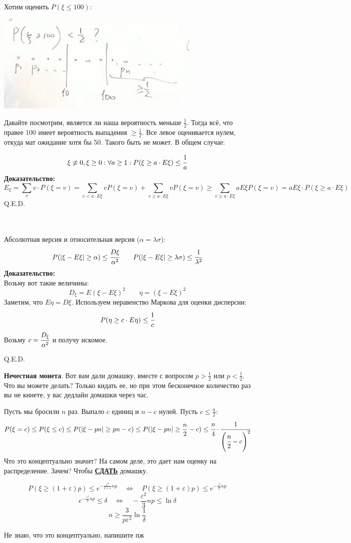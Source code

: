 Хотим оценить $P(\xi\leq 100)$:
\begin{center}
    \includegraphics[width = 10cm]{assets/3_3_1.jpg}
\end{center}

Давайте посмотрим, является ли наша вероятность меньше $\frac 1 2$. Тогда всё, что правее 100 имеет вероятность выпадения $\geq \frac1 2 $. Все левое оценивается нулем, откуда мат ожидание хотя бы 50. Такого быть не может. В общем случае:

$$\xi\not \equiv0,\xi\geq 0: \forall a\geq 1: P(\xi\geq a \cdot E\xi) \leq \cfrac{1}{a}$$
\textbf{Доказательство:}
$$E_{\xi} = \sum\limits_{v}v \cdot P(\xi = v) = \sum\limits_{v < a \cdot E\xi} v P(\xi = v)+ \sum\limits_{v\geq a\cdot E\xi} v P(\xi=v)\geq \sum\limits_{v\geq a\cdot E\xi} a E{\xi} P(\xi=v) = a E{\xi}\cdot P (\xi\geq a\cdot E{\xi})$$
\hfill Q.E.D.

 \\  \\
Абсолютная версия и относительная версия ($\alpha = \lambda\sigma$):
$$P(|\xi-E\xi|\geq \alpha)\leq \cfrac{D\xi}{\alpha^2} \quad \quad P(|\xi-E\xi|\geq \lambda\sigma)\leq \cfrac{1}{\lambda^2}$$
\textbf{Доказательство:}\\
Возьму вот такие величины:
$$D_{\xi} = E(\xi-E\xi)^2\quad \quad  \eta = (\xi-E\xi)^2$$
Заметим, что $E\eta=D\xi$. Используем неравенство Маркова для оценки дисперсии:
$$P(\eta\geq c \cdot E\eta)\leq \cfrac{1}{c}$$
Возьму $c= \cfrac{D_{\xi}}{\alpha^2}$ и получу искомое.

\hfill Q.E.D.

\textbf{Нечестная монета}. Вот вам дали домашку, вместе  с вопросом $p>\frac{1}{2}$ или $p<\frac{1}{2}$. Что вы можете делать? Только кидать ее, но при этом бесконечное количество раз вы не кинете, у вас дедлайн домашки через час. 

Пусть мы бросили $n$ раз. Выпало $c$ единиц и $n-c$ нулей. Пусть $c\le \frac{n}{2}$:
$$P(\xi = c)\leq P(\xi\leq c)\leq P(|\xi-pn|\geq pn-c)\leq  P(|\xi-pn|\geq \frac n 2 - c)\leq \cfrac{n}{4}\cdot \cfrac{1}{\left(\cfrac{n}{2}-c\right)^2}$$
Что это концептуально значит? На самом деле, это дает нам оценку на распределение. Зачем? Чтобы \textbf{\uline{СДАТЬ}} домашку.

$$P(\xi\geq (1+\varepsilon)p)\leq e^{-\frac{\varepsilon^2}{2+\varepsilon}np} \quad \Leftrightarrow\quad P(\xi\geq (1+\varepsilon)p)\leq e^{-\frac{\varepsilon^2}{2}np}$$
$$e^{-\frac{\varepsilon^2}{3}np}\leq \delta\quad \Leftrightarrow\quad -\dfrac{\varepsilon^2}{3}np\leq \ln{\delta}$$
$$n\geq \frac{3}{p\varepsilon^2}\ln{\frac{1}{\delta}}$$

Не знаю, что это концептуально, напишите пж